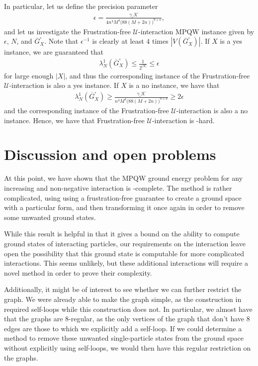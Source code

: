 \documentclass[../thesis-main/thesis-main]{subfiles}
\begin{document}
In particular, let us define the precision parameter 
\begin{align}
  \epsilon = \frac{\gamma_\square \mathcal{K}}{4n^4 M^4 \big(88(M+2n)\big)^{9+\nu}},
\end{align}
and let us investigate the Frustration-free $\mathcal{U}$-interaction MPQW instance given by $\epsilon$, $N$, and $\overline{G}_X^\square$.  Note that $\epsilon^{-1}$ is clearly at least $4$ times $|V(\overline{G}_X^\square)|$. If $X$ is a yes instance, we are guaranteed that 
\begin{align}
  \lambda_N^1(\overline{G}^\square_X) \leq \frac{1}{2^{|X|}} \leq \epsilon
\end{align}
for large enough $|X|$, and thus the corresponding instance of the Frustration-free $\mathcal{U}$-interaction is also a yes instance.  If $X$ is a no instance, we have that
\begin{align}
    \lambda_N^1(\overline{G}^\square_X) \geq  \frac{\gamma_\square \mathcal{K}}{n^4 M^4 \big(88(M+2n)\big)^{9+\nu}} \geq 2\epsilon
\end{align}
and the corresponding instance of the Frustration-free $\mathcal{U}$-interaction is also a no instance. Hence, we have that Frustration-free $\mathcal{U}$-interaction is \QMA-hard.




\section{Discussion and open problems}

At this point, we have shown that the MPQW ground energy problem for any increasing and non-negative interaction is \QMA-complete.  The method is rather complicated, using using a frustration-free guarantee to create a ground space with a particular form, and then transforming it once again in order to remove some unwanted ground states. 

While this result is helpful in that it gives a bound on the ability to compute ground states of interacting particles, our requirements on the interaction leave open the possibility that this ground state is computable for more complicated interactions.  This seems unlikely, but these additional interactions will require a novel method in order to prove their complexity.

Additionally, it might be of interest to see whether we can further restrict the graph.  We were already able to make the graph simple, as the construction in \cite{BHQMA} required self-loops while this construction does not.  In particular, we almost have that the graphs are 8-regular, as the only vertices of the graph that don't have 8 edges are those to which we explicitly add a self-loop.  If we could determine a method to remove these unwanted single-particle states from the ground space without explicitly using self-loops, we would then have this regular restriction on the graphs.
\end{document}
